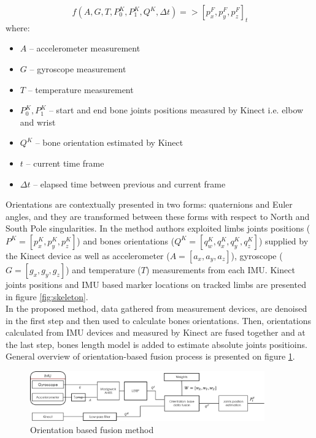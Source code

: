 \documentclass[9pt]{llncs}
\begin{document}
\begin{equation}
	\label{eq:generalForm}
	f(A,G,T,P_0^K,P_1^K,Q^K,\Delta t) => [p_x^F,p_y^F,p_z^F]_t
\end{equation}
where:
\begin{itemize}
	\item $A$ -- accelerometer measurement
	\item $G$ -- gyroscope measurement
	\item $T$ -- temperature measurement
	\item $P_0^K,P_1^K$ -- start and end bone joints positions measured by Kinect i.e. elbow and wrist
	\item $Q^K$ -- bone orientation estimated by Kinect
	\item $t$ -- current time frame
	\item $\Delta t$ -- elapsed time between previous and current frame
\end{itemize}

Orientations are contextually presented in two forms: quaternions and Euler angles, and they are transformed between these forms with respect to North and South Pole singularities. In the method authors exploited limbs joints positions ($P^K=[p_x^K,p_y^K,p_z^K]$) and bones orientations ($Q^K=[q_w^K,q_x^K,q_y^K,q_z^K]$) supplied by the Kinect device as well as accelerometer ($A=[a_x,a_y,a_z]$), gyroscope ($G=[g_x,g_y,g_z]$) and temperature ($T$) measurements from each IMU. Kinect joints positions and IMU based marker locations on tracked limbs are presented in figure \ref{fig:skeleton}. \\
In the proposed method, data gathered from measurement devices, are denoised in the first step and then used to calculate bones orientations. Then, orientations calculated from IMU devices and measured by Kinect are fused together and at the last step, bones length model is added to estimate absolute joints positioins. General overview of orientation-based fusion process is presented on figure \ref{fig:orientationBasedMethod}.
 
\begin{figure}[!htb]
	\centering 
	\includegraphics[width=0.9\textwidth]{Fig04.eps}
	\caption{Orientation based fusion method}
	\label{fig:orientationBasedMethod}
\end{figure}
\end{document}

